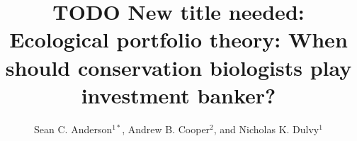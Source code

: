 \documentclass[12pt]{article}
\title{TODO New title needed: Ecological portfolio theory:
  When should conservation biologists play investment banker?}
\author{Sean C. Anderson$^{1\ast}$,
  Andrew B. Cooper$^2$,
  and Nicholas K. Dulvy$^1$}
\date{}
\begin{document}
%
%



\clearpage
\linenumbers
\begin{spacing}{1.25}



\clearpage

\clearpage


\end{spacing}
\end{document}
